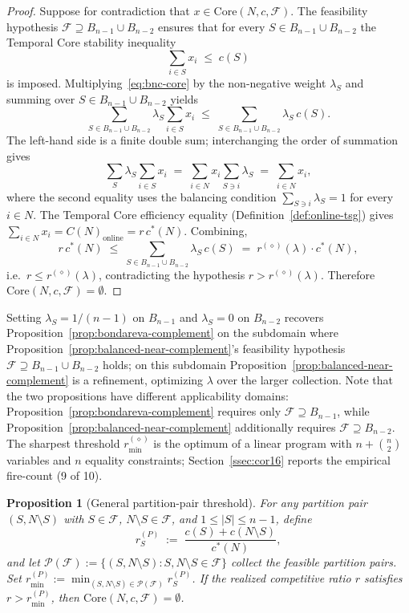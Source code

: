 \documentclass[11pt]{article}
\theoremstyle{plain}
\newtheorem{proposition}[theorem]{Proposition}
\theoremstyle{definition}
\theoremstyle{remark}
\newcommand{\F}{\mathcal{F}}
\newcommand{\cstar}{c^{\ast}}
\begin{document}
\begin{proof}
Suppose for contradiction that $x\in\mathrm{Core}(N,c,\F)$. The feasibility hypothesis $\F\supseteq B_{n-1}\cup B_{n-2}$ ensures that for every $S\in B_{n-1}\cup B_{n-2}$ the Temporal Core stability inequality
\begin{equation}
\label{eq:bnc-core}
\sum_{i\in S}x_i \;\le\; c(S)
\end{equation}
is imposed. Multiplying~\eqref{eq:bnc-core} by the non-negative weight $\lambda_S$ and summing over $S\in B_{n-1}\cup B_{n-2}$ yields
\[
\sum_{S\in B_{n-1}\cup B_{n-2}}\lambda_S \sum_{i\in S} x_i \;\le\; \sum_{S\in B_{n-1}\cup B_{n-2}}\lambda_S\,c(S).
\]
The left-hand side is a finite double sum; interchanging the order of summation gives
\[
\sum_{S}\lambda_S \sum_{i\in S}x_i \;=\; \sum_{i\in N} x_i \sum_{S\ni i}\lambda_S \;=\; \sum_{i\in N} x_i,
\]
where the second equality uses the balancing condition $\sum_{S\ni i}\lambda_S=1$ for every $i\in N$. The Temporal Core efficiency equality (Definition~\ref{def:online-tsg}) gives $\sum_{i\in N} x_i = C(N)_{\text{online}} = r\,\cstar(N)$. Combining,
\[
r\,\cstar(N) \;\le\; \sum_{S\in B_{n-1}\cup B_{n-2}}\lambda_S\,c(S) \;=\; r^{(\diamond)}(\lambda)\cdot \cstar(N),
\]
i.e.\ $r\le r^{(\diamond)}(\lambda)$, contradicting the hypothesis $r>r^{(\diamond)}(\lambda)$. Therefore $\mathrm{Core}(N,c,\F)=\emptyset$.
\end{proof}

Setting $\lambda_S=1/(n-1)$ on $B_{n-1}$ and $\lambda_S=0$ on $B_{n-2}$ recovers Proposition~\ref{prop:bondareva-complement} on the subdomain where Proposition~\ref{prop:balanced-near-complement}'s feasibility hypothesis $\F\supseteq B_{n-1}\cup B_{n-2}$ holds; on this subdomain Proposition~\ref{prop:balanced-near-complement} is a refinement, optimizing $\lambda$ over the larger collection. Note that the two propositions have different applicability domains: Proposition~\ref{prop:bondareva-complement} requires only $\F\supseteq B_{n-1}$, while Proposition~\ref{prop:balanced-near-complement} additionally requires $\F\supseteq B_{n-2}$. The sharpest threshold $r^{(\diamond)}_{\min}$ is the optimum of a linear program with $n+\binom{n}{2}$ variables and $n$ equality constraints; Section~\ref{ssec:cor16} reports the empirical fire-count (9 of 10).

\begin{proposition}[General partition-pair threshold]
\label{prop:partition-pair}
For any partition pair $(S,N\setminus S)$ with $S\in\F$, $N\setminus S\in\F$, and $1\le|S|\le n-1$, define
\[
r^{(P)}_{S} \;:=\; \frac{c(S)+c(N\setminus S)}{\cstar(N)},
\]
and let $\mathcal{P}(\F):=\{(S,N\setminus S):S,N\setminus S\in\F\}$ collect the feasible partition pairs. Set $r^{(P)}_{\min}:=\min_{(S,N\setminus S)\in\mathcal{P}(\F)} r^{(P)}_{S}$. If the realized competitive ratio $r$ satisfies $r>r^{(P)}_{\min}$, then $\mathrm{Core}(N,c,\F)=\emptyset$.
\end{proposition}
\end{document}
